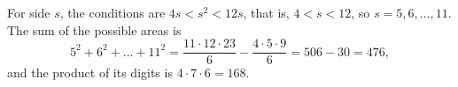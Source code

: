 For side $s$, the conditions are $4s<s^2<12s$, that is, $4<s<12$, so $s=5,6,\dots,11$. The sum of the possible areas is
\[
5^2+6^2+\dots+11^2=\dfrac{11\cdot12\cdot23}{6}-\dfrac{4\cdot5\cdot9}{6}=506-30=476,
\]
and the product of its digits is $4\cdot7\cdot6=\boxed{168}$.
